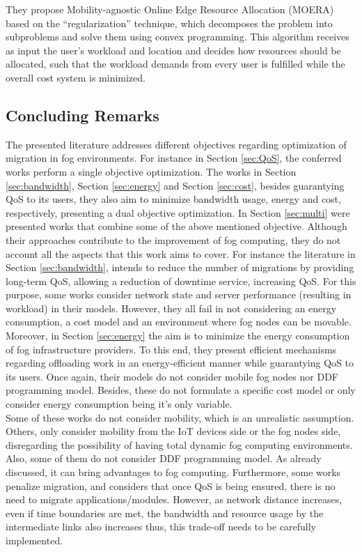 They propose Mobility-agnostic Online Edge Resource Allocation (MOERA) based on the ``regularization'' technique, which decomposes the problem into subproblems and solve them using convex programming. This algorithm receives as input the user’s workload and location and decides how resources should be allocated, such that the workload demands from every user is fulfilled while the overall cost system is minimized.

\subsection{Concluding Remarks}
The presented literature addresses different objectives regarding optimization of migration in fog environments. For instance in Section \ref{sec:QoS}, the conferred works perform a single objective optimization. The works in Section \ref{sec:bandwidth}, Section \ref{sec:energy} and Section \ref{sec:cost}, besides guarantying QoS to its users, they also aim to minimize bandwidth usage, energy and cost, respectively, presenting a dual objective optimization. In Section \ref{sec:multi} were presented works that combine some of the above mentioned objective.  Although their approaches contribute to the improvement of fog computing, they do not account all the aspects that this work aims to cover. For instance the literature in Section \ref{sec:bandwidth}, intends to reduce the number of migrations by providing long-term QoS, allowing a reduction of downtime service, increasing QoS. For this purpose, some works consider network state and server performance (resulting in workload) in their models. However, they all fail in not considering an energy consumption, a cost model and an environment where fog nodes can be movable. Moreover, in Section \ref{sec:energy} the aim is to minimize the energy consumption of fog infrastructure providers. To this end, they present efficient mechanisms regarding offloading work in an energy-efficient manner while guarantying QoS to its users. Once again, their models do not consider mobile fog nodes nor DDF programming model. Besides, these do not formulate a specific cost model or only consider energy consumption being it's only variable.\\
\noindent\tab Some of these works do not consider mobility, which is an unrealistic assumption. Others, only consider mobility from the IoT devices side or the fog nodes side, disregarding the possibility of having total dynamic fog computing environments. Also, some of them do not consider DDF programming model. As already discussed, it can bring advantages to fog computing. Furthermore, some works penalize migration, and considers that once QoS is being ensured, there is no need to migrate applications/modules. However, as network distance increases, even if time boundaries are met, the bandwidth and resource usage by the intermediate links also increases thus, this trade-off needs to be carefully implemented.